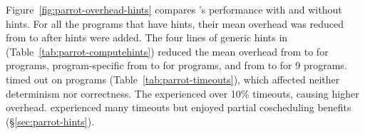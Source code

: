 Figure~\ref{fig:parrot-overhead-hints} compares \parrot's performance with and
without hints.  For all the \nprogneedhints programs that 
have hints, their mean overhead was reduced from
\overallnohints to \overallhints after hints were added. The four lines of generic
\compute hints in \libgomp (Table~\ref{tab:parrot-computehints}) 
reduced the mean overhead from \genericnolineup
to \genericlineup for \nproggenericlineuphints programs, program-specific
\computes from \specificnolineup to \specificlineup for
\nprogspecificlineuphints programs, and \nondets from \nondetnohints
to \nondethints for 9 programs.  \Computes timed out on
\nlineupfails programs (Table~\ref{tab:parrot-timeouts}), which affected neither
determinism nor correctness. The  \kmeans experienced over 10\% timeouts,
causing higher overhead. \xtwosixfour experienced many timeouts
but enjoyed partial coscheduling benefits (\S\ref{sec:parrot-hints}).







